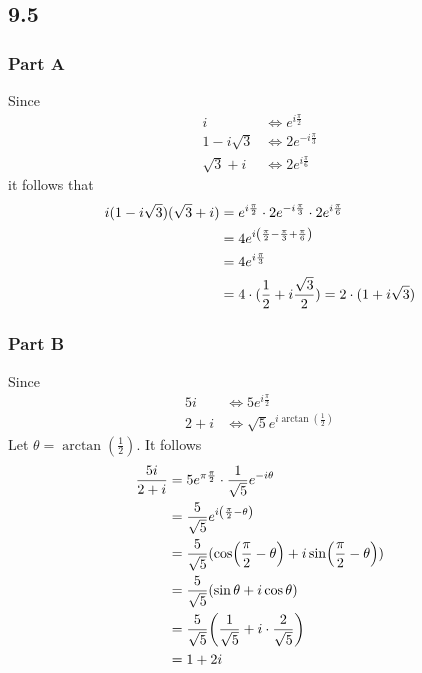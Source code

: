 \documentclass[12pt,titlepage]{extarticle}
\begin{document}
\subsection*{9.5}
\subsubsection*{Part A}
Since
\begin{align*}
    i &\Leftrightarrow e^{i\frac{\pi}{2}} \\
    1 - i\sqrt{3} &\Leftrightarrow 2e^{-i \frac{\pi}{3}} \\
    \sqrt{3} + i &\Leftrightarrow 2e^{i \frac{\pi}{6}}
\end{align*}
it follows that
\begin{align*}
    i (1 - i\sqrt{3})(\sqrt{3} + i) &= e^{i \frac{\pi}{2}} \cdot 2 e^{-i \frac{\pi}{3}} \cdot 2e^{i \frac{\pi}{6}} \\
    &= 4 e^{i\qty(\frac{\pi}{2} - \frac{\pi}{3} + \frac{\pi}{6})} \\
    &= 4e^{i \frac{\pi}{3}} \\
    &= 4 \cdot (\frac{1}{2} + i\frac{\sqrt{3}}{2}) = 2 \cdot (1 + i\sqrt{3})
\end{align*}

\subsubsection*{Part B}
Since
\begin{align*}
    5i &\Leftrightarrow 5 e^{i \frac{\pi}{2}} \\
    2 + i &\Leftrightarrow \sqrt{5} e^{i \arctan(\frac{1}{2})}
\end{align*}
Let $\theta = \arctan(\frac{1}{2})$. It follows
\begin{align*}
    \frac{5i}{2+i} &= 5e^{\pi \frac{\pi}{2}} \cdot \frac{1}{\sqrt{5}} e^{-i \theta} \\
                   &= \frac{5}{\sqrt{5}} e^{i \qty(\frac{\pi}{2} - \theta)} \\
                   &= \frac{5}{\sqrt{5}} (\cos(\frac{\pi}{2} - \theta) + i \sin(\frac{\pi}{2} - \theta)) \\
                   &= \frac{5}{\sqrt{5}} (\sin \theta + i \cos \theta) \\
                   &= \frac{5}{\sqrt{5}} \qty(\frac{1}{\sqrt{5}} + i\cdot \frac{2}{\sqrt{5}}) \\
                   &= 1 + 2i
\end{align*}
\end{document}
